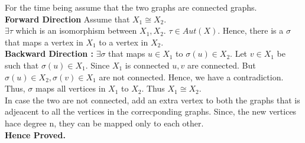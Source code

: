 For the time being assume that the two graphs are connected graphs.\\
\textbf{Forward Direction} Assume that $X_1 \cong X_2$.\\
	$\exists \tau$ which is an isomorphism between $X_1,X_2$. $\tau \in Aut(X)$. Hence, there is a $\sigma$ that maps a vertex in $X_1$ to a vertex in $X_2$.\\
\textbf{Backward Direction :} $\exists \sigma$ that maps $u \in X_1$ to $\sigma(u) \in X_2$. Let $v \in X_1$ be such that $\sigma(u) \in X_1$. Since $X_1$ is connected $u,v$ are connected. But $\sigma(u) \in X_2, \sigma(v) \in X_1$ are not connected. Hence, we have a contradiction. Thus, $\sigma$ maps all vertices in $X_1$ to $X_2$. Thus $X_1 \cong X_2$.\\

In case the two are not connected, add an extra vertex to both the graphs that is adjeacent to all the vertices in the correcponding graphs. Since, the new vertices hace degree n, they can be mapped only to each other.\\
\textbf{Hence Proved.}

